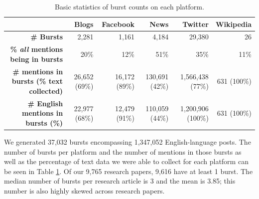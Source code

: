 \documentclass[letterpaper]{article} %
\begin{document}

\begin{table}[t]
    \centering
    \begin{tabular}{@{}r|r r r r r @{}}
    & \textbf{Blogs} & \textbf{Facebook} & \textbf{News} & \textbf{Twitter} & \textbf{Wikipedia} \\
    \hline
    \textbf{\# Bursts} & 2,281 & 1,161 & 4,184 & 29,380 & 26 \\
    \textbf{\% \textit{all} mentions being in bursts} & 20\% & 12\% & 51\% & 35\% & 11\% \\
    \textbf{\# mentions in bursts (\% text collected)} & 26,652 (69\%) & 16,172 (89\%) & 130,691 (42\%) & 1,566,438 (77\%) & 631 (100\%) \\
    \textbf{\# English mentions in bursts (\%)} & 22,977 (68\%) & 12,479 (91\%) & 110,059 (44\%) & 1,200,906 (100\%) & 631 (100\%)\\
    \end{tabular}
    \caption{Basic statistics of burst counts on each platform.}
    \label{tab:burst_post_counts}
\end{table}


We generated 37,032 bursts encompassing 1,347,052 English-language posts. The number of bursts per platform and the number of mentions in those bursts as well as the percentage of text data we were able to collect for each platform can be seen in Table \ref{tab:burst_post_counts}. 
Of our 9,765 research papers, 9,616 have at least 1 burst. The median number of bursts per research article is 3 and the mean is 3.85; this number is also highly skewed across research papers.%
\end{document}
